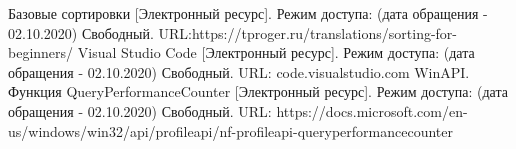 \documentclass{article}
\begin{document}
	\begin{center}
	\begin{thebibliography}{3}
	Базовые сортировки [Электронный ресурс]. Режим доступа: (дата обращения - 02.10.2020) Свободный. URL:https://tproger.ru/translations/sorting-for-beginners/
	Visual Studio Code [Электронный ресурс]. Режим доступа: (дата обращения - 02.10.2020) Свободный. URL: code.visualstudio.com
		WinAPI. Функция QueryPerformanceCounter [Электронный ресурс]. Режим доступа: (дата обращения - 02.10.2020) Свободный. URL: https://docs.microsoft.com/en-us/windows/win32/api/profileapi/nf-profileapi-queryperformancecounter
	\end{thebibliography}
	\end{center}
\end{document}
